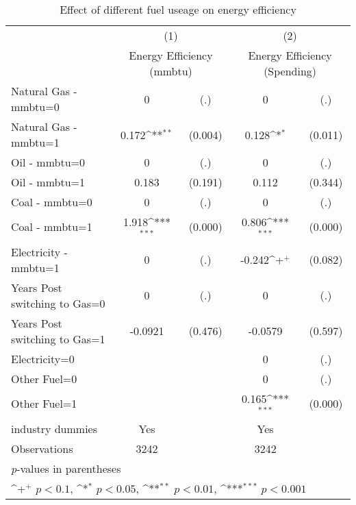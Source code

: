 \begin{table}[htbp]\centering
\def\sym#1{\ifmmode^{#1}\else\(^{#1}\)\fi}
\caption{Effect of different fuel useage on energy efficiency}
\begin{tabular}{l*{2}{cc}}
\toprule
                    &\multicolumn{2}{c}{(1)}           &\multicolumn{2}{c}{(2)}           \\
                    &\multicolumn{2}{c}{Energy Efficiency (mmbtu)}&\multicolumn{2}{c}{Energy Efficiency (Spending)}\\
\midrule
Natural Gas - mmbtu=0&           0         &         (.)&           0         &         (.)\\
Natural Gas - mmbtu=1&       0.172\sym{**} &     (0.004)&       0.128\sym{*}  &     (0.011)\\
Oil - mmbtu=0       &           0         &         (.)&           0         &         (.)\\
Oil - mmbtu=1       &       0.183         &     (0.191)&       0.112         &     (0.344)\\
Coal - mmbtu=0      &           0         &         (.)&           0         &         (.)\\
Coal - mmbtu=1      &       1.918\sym{***}&     (0.000)&       0.806\sym{***}&     (0.000)\\
Electricity - mmbtu=1&           0         &         (.)&      -0.242\sym{+}  &     (0.082)\\
Years Post switching to Gas=0&           0         &         (.)&           0         &         (.)\\
Years Post switching to Gas=1&     -0.0921         &     (0.476)&     -0.0579         &     (0.597)\\
Electricity=0       &                     &            &           0         &         (.)\\
Other Fuel=0        &                     &            &           0         &         (.)\\
Other Fuel=1        &                     &            &       0.165\sym{***}&     (0.000)\\
industry dummies    &         Yes         &            &         Yes         &            \\
\midrule
Observations        &        3242         &            &        3242         &            \\
\bottomrule
\multicolumn{5}{l}{\footnotesize \textit{p}-values in parentheses}\\
\multicolumn{5}{l}{\footnotesize \sym{+} \(p<0.1\), \sym{*} \(p<0.05\), \sym{**} \(p<0.01\), \sym{***} \(p<0.001\)}\\
\end{tabular}
\end{table}
